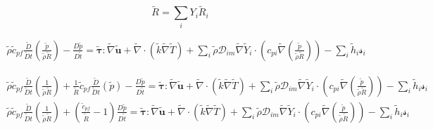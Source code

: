 \documentclass[preprint,12pt,authoryear]{elsarticle}
\begin{document}
\begin{equation}
	\tilde{R}=\sum_iY_i\tilde{R}_i
\end{equation}

\begin{equation}
\begin{split}
        \tilde{\rho}
        \tilde{c}_{pf}
        \frac{\tilde{D}}{\tilde{D} t}
        \left(
                \frac{\tilde{p}}{\tilde{\rho}\tilde{R}}
        \right)
        -
        \frac{D \tilde{p}}{D\tilde{t}}
        =
        \pmb{\tilde{\tau}}:\tilde{\nabla} \tilde{\mathbf{u}} 
        + 
        \tilde{\nabla} \cdot (\tilde{k}\tilde{\nabla} \tilde{T})
        +
        \sum\limits_i 
        \tilde{\rho}
        \mathcal{D}_{im}
        \tilde{\nabla}
        \tilde{Y}_i     
        \cdot
        \left(
                c_{pi}
                \tilde{\nabla}
                \left(
                	\frac{\tilde{p}}{\tilde{\rho}\tilde{R}}
        	\right)
        \right)
	-
        \sum\limits_i
        \tilde{h}_i
        \mathcal{s}_i	
\end{split}
\end{equation}

\begin{equation}
\begin{split}
        \tilde{\rho}
        \tilde{c}_{pf}
        \frac{\tilde{D}}{\tilde{D} t}
        \left(
                \frac{1}{\tilde{\rho}\tilde{R}}
        \right)
	+
        \frac{1}{\tilde{R}}
        \tilde{c}_{pf}
        \frac{\tilde{D}}{\tilde{D} t}
        \left(
                \tilde{p}
        \right)
        -
        \frac{D \tilde{p}}{D\tilde{t}}
        =
        \pmb{\tilde{\tau}}:\tilde{\nabla} \tilde{\mathbf{u}} 
        + 
        \tilde{\nabla} \cdot (\tilde{k}\tilde{\nabla} \tilde{T})
        +
        \sum\limits_i 
        \tilde{\rho}
        \mathcal{D}_{im}
        \tilde{\nabla}
        \tilde{Y}_i     
        \cdot
        \left(
                c_{pi}
                \tilde{\nabla}
                \left(
                	\frac{\tilde{p}}{\tilde{\rho}\tilde{R}}
                \right)
        \right)
	-
        \sum\limits_i
        \tilde{h}_i
        \mathcal{s}_i	
\\
        \tilde{\rho}
        \tilde{c}_{pf}
        \frac{\tilde{D}}{\tilde{D} t}
        \left(
                \frac{1}{\tilde{\rho}\tilde{R}}
        \right)
	+
        \left(
        	\frac{\tilde{c}_{pf}}{\tilde{R}}
		-1
        \right)
        \frac{D \tilde{p}}{D\tilde{t}}
        =
        \pmb{\tilde{\tau}}:\tilde{\nabla} \tilde{\mathbf{u}} 
        + 
        \tilde{\nabla} \cdot (\tilde{k}\tilde{\nabla} \tilde{T})
        +
        \sum\limits_i 
        \tilde{\rho}
        \mathcal{D}_{im}
        \tilde{\nabla}
        \tilde{Y}_i     
        \cdot
        \left(
                c_{pi}
                \tilde{\nabla}
                \left(
                	\frac{\tilde{p}}{\tilde{\rho}\tilde{R}}
                \right)
        \right)
	-
        \sum\limits_i
        \tilde{h}_i
        \mathcal{s}_i	
\end{split}
\end{equation}
\end{document}
